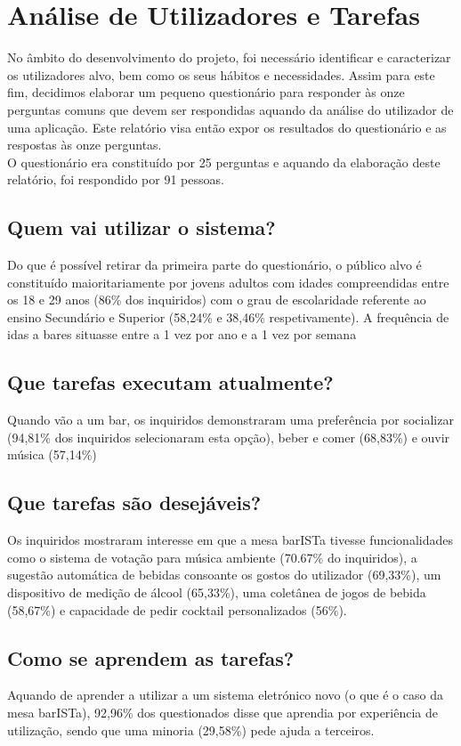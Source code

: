 \documentclass{article}
\begin{document}
\section*{Análise de Utilizadores e Tarefas}

No âmbito do desenvolvimento do projeto, foi necessário identificar e caracterizar os utilizadores alvo, bem como os seus hábitos e necessidades. Assim para este fim, decidimos elaborar um pequeno questionário para responder às onze perguntas comuns que devem ser respondidas aquando da análise do utilizador de uma aplicação. Este relatório visa então expor os resultados do questionário e as respostas às onze perguntas.\\
O questionário era constituído por 25 perguntas e aquando da elaboração deste relatório, foi respondido por 91 pessoas.

\subsection*{Quem vai utilizar o sistema?}
Do que é possível retirar da primeira parte do questionário, o público alvo é constituído maioritariamente por jovens adultos com idades compreendidas entre os 18 e 29 anos (86\% dos inquiridos) com o grau de escolaridade referente ao ensino Secundário e Superior (58,24\% e 38,46\% respetivamente). A frequência de idas a bares situasse entre a 1 vez por ano e a 1 vez por semana
\subsection*{Que tarefas executam atualmente?}
Quando vão a um bar, os inquiridos demonstraram uma preferência por socializar (94,81\% dos inquiridos selecionaram esta opção), beber e comer (68,83\%) e ouvir música (57,14\%)
\subsection*{Que tarefas são desejáveis?}
Os inquiridos mostraram interesse em que a mesa barISTa tivesse funcionalidades como o sistema de votação para música ambiente (70.67\% do inquiridos), a sugestão automática de bebidas consoante os gostos do utilizador (69,33\%), um dispositivo de medição de álcool (65,33\%), uma coletânea de jogos de bebida (58,67\%) e capacidade de pedir cocktail personalizados (56\%).
\subsection*{Como se aprendem as tarefas?}
Aquando de aprender a utilizar a um sistema eletrónico novo (o que é o caso da mesa barISTa), 92,96\% dos questionados disse que aprendia por experiência de utilização, sendo que uma minoria (29,58\%) pede ajuda a terceiros.
\end{document}
